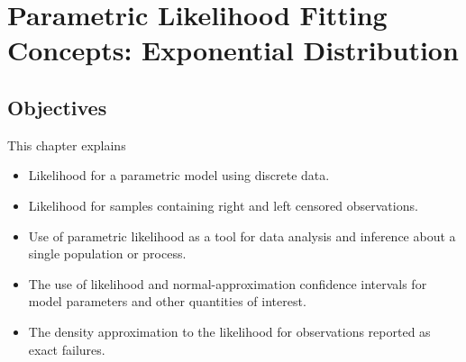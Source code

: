 \setcounter{chapter}{6}

\chapter{Parametric Likelihood Fitting Concepts: Exponential Distribution}
\label{chapter:parametric.ml.one.par}



\section*{Objectives}
This chapter explains
\begin{itemize} 
\item 
Likelihood for a parametric model using discrete
data.
\item
Likelihood for samples containing right 
and left censored observations.
\item 
Use of parametric likelihood as a tool for data
analysis and inference about a single population or process.
\item
The use of likelihood and normal-approximation
confidence intervals for model parameters and
other quantities of interest.
\item 
The density approximation to the 
likelihood for observations reported as exact failures.
\end{itemize}

